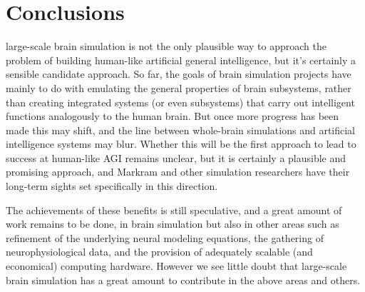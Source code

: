 \documentclass[11pt,fleqn]{book} %
\begin{document}
\pagestyle{fancy} %










\chapter{Conclusions}

large-scale brain simulation is not the only
plausible way to approach the problem of building human-like
artificial general intelligence, but it's certainly a sensible candidate approach. So far, the goals of brain simulation projects have
mainly to do with emulating the general properties of brain
subsystems, rather than creating integrated systems (or even
subsystems) that carry out intelligent functions analogously to
the human brain. But once more progress has been made this may
shift, and the line between whole-brain simulations and artificial
intelligence systems may blur. Whether this will be the first
approach to lead to success at human-like AGI remains unclear,
but it is certainly a plausible and promising approach, and
Markram and other simulation researchers have their long-term
sights set specifically in this direction.

The achievements of these benefits is still speculative, and a
great amount of work remains to be done, in brain simulation but
also in other areas such as refinement of the underlying neural
modeling equations, the gathering of neurophysiological data, and
the provision of adequately scalable (and economical) computing
hardware. However we see little doubt that large-scale brain
simulation has a great amount to contribute in the above areas
and others.








\end{document}
